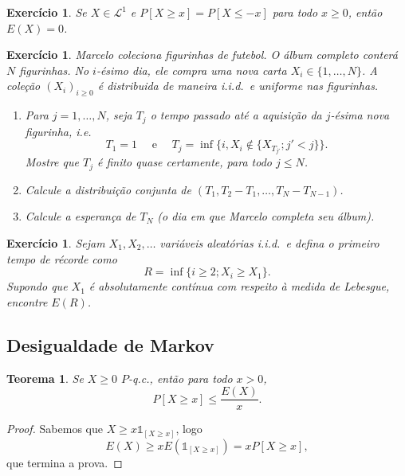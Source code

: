 \documentclass[reqno, draft]{book}
\newcommand*\1{\mathds{1}}
\newtheorem{theorem}{Teorema}[section]
\newtheorem{exercise}[example]{Exercício}
\def \iid{i.i.d.~}
\begin{document}
\begin{exercise}
  Se $X \in \mathcal{L}^1$ e $P[X \geq x] = P[X \leq -x]$ para todo $x \geq 0$, então $E(X) = 0$.
\end{exercise}

\begin{exercise}
  Marcelo coleciona figurinhas de futebol.
  O álbum completo conter\'a $N$ figurinhas. No $i$-ésimo dia, ele compra uma nova carta $X_i \in \{1, \dots, N\}$.
  A cole\c{c}\~ao $(X_i)_{i \geq 0}$ é distribuida de maneira \iid e uniforme nas figurinhas.
  \begin{enumerate}[\quad a)]
  \item Para $j = 1, \dots, N$, seja $T_j$ o tempo passado até a aquisi\c{c}\~ao da $j$-ésima nova figurinha, i.e.
    \begin{equation}
      T_1 = 1 \quad \text{ e } \quad T_j = \inf\{i, X_i \not \in \{X_{T_{j'}}; j' < j\}\}.
    \end{equation}
    Mostre que $T_j$ é finito quase certamente, para todo $j \leq N$.
  \item Calcule a distribuição conjunta de $(T_1, T_2 - T_1, \dots, T_N - T_{N-1})$.
  \item Calcule a esperança de $T_N$ (o dia em que Marcelo completa seu álbum).
  \end{enumerate}
\end{exercise}

\begin{exercise}
  Sejam $X_1, X_2, \dots$ variáveis aleatórias \iid e defina o primeiro tempo de récorde como
  \begin{equation}
    R = \inf\{i \geq 2; X_i \geq X_1\}.
  \end{equation}
  Supondo que $X_1$ é absolutamente contínua com respeito à medida de Lebesgue, encontre $E(R)$.
\end{exercise}

\subsection{Desigualdade de Markov}

\begin{theorem}
  Se $X \geq 0$ $P$-q.c., então para todo $x > 0$,
  \begin{equation}
    P[X \geq x] \leq \frac{E(X)}{x}.
  \end{equation}
\end{theorem}

\begin{proof}
  Sabemos que $X \geq x \1_{[X \geq x]}$, logo
  \begin{equation}
    E(X) \geq x E(\1_{[X \geq x]}) = x P[X \geq x],
  \end{equation}
  que termina a prova.
\end{proof}
\end{document}
